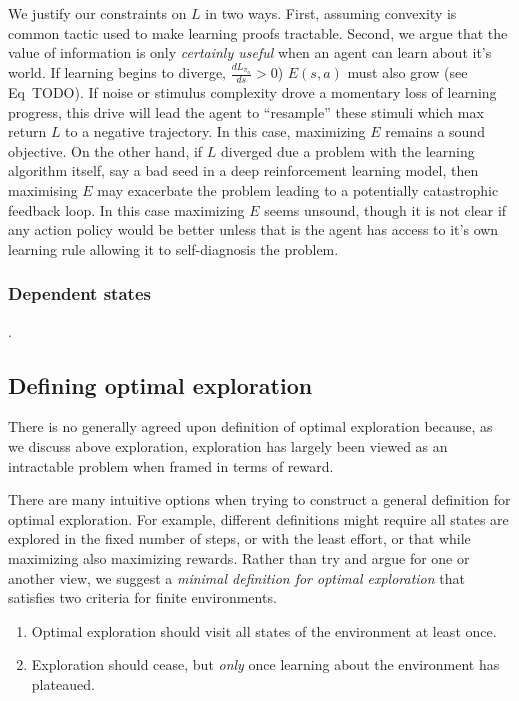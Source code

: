 \documentclass[9pt,twocolumn,twoside]{pnas-new}
\begin{document}
We justify our constraints on $L$ in two ways. First, assuming convexity is common tactic used to make learning proofs tractable. Second, we argue that the value of information is only \textit{certainly useful} when an agent can learn about it's world. If learning begins to diverge, $\frac{dL_{\pi_{a}}}{ds} > 0$) $E(s, a)$ must also grow (see Eq~TODO). If noise or stimulus complexity drove a momentary loss of learning progress, this drive will lead the agent to ``resample'' these stimuli which max return $L$ to a negative trajectory. In this case, maximizing $E$ remains a sound objective. On the other hand, if $L$ diverged due a problem with the learning algorithm itself, say a bad seed in a deep reinforcement learning model, then maximising $E$ may exacerbate the problem leading to a potentially catastrophic feedback loop. In this case maximizing $E$ seems unsound, though it is not clear if any action policy would be better unless that is the agent has access to it's own learning rule allowing it to self-diagnosis the problem.

\subsubsection*{Dependent states}.

\subsection*{Defining optimal exploration}
There is no generally agreed upon definition of optimal exploration because, as we discuss above exploration, exploration has largely been viewed as an intractable problem when framed in terms of reward. 

There are many intuitive options when trying to construct a general definition for optimal exploration. For example, different definitions might require all states are explored in the fixed number of steps, or with the least effort, or that while maximizing also maximizing rewards. Rather than try and argue for one or another view, we suggest a \textit{minimal definition for optimal exploration} that satisfies two criteria for finite environments. 

\begin{enumerate}[noitemsep,wide=0pt,leftmargin=\dimexpr\labelwidth+2\labelsep\relax]
    \item Optimal exploration should visit all states of the environment at least once. 
    \item Exploration should cease, but \textit{only} once learning about the environment has plateaued. 
\end{enumerate}
\end{document}
